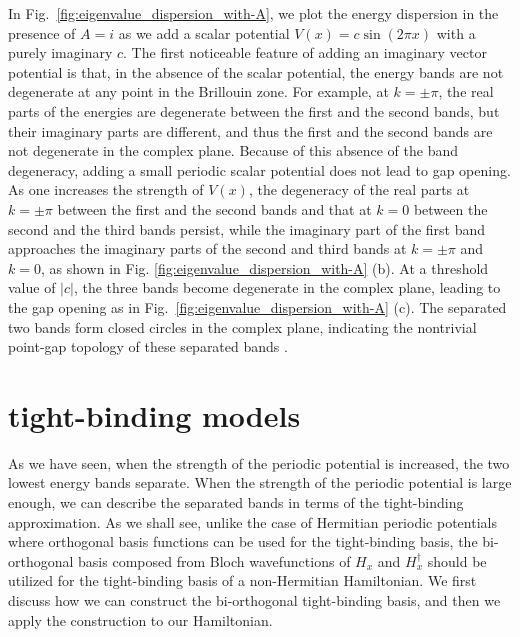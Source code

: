 \documentclass[prb,superscriptaddress,floatfix,twocolumn,showpacs]{revtex4-2}
\begin{document}
In Fig.~\ref{fig:eigenvalue_dispersion_with-A}, we plot the energy dispersion in the presence of $A = i$ as we add a scalar potential $V(x) = c \sin (2\pi x)$ with a purely imaginary $c$. 
The first noticeable feature of adding an imaginary vector potential is that, in the absence of the scalar potential, the energy bands are not degenerate at any point in the Brillouin zone. 
For example, at $k = \pm \pi$, the real parts of the energies are degenerate between the first and the second bands, but their imaginary parts are different, and thus the first and the second bands are not degenerate in the complex plane. 
Because of this absence of the band degeneracy, adding a small periodic scalar potential does not lead to gap opening. 
As one increases the strength of $V(x)$, the degeneracy of the real parts at $k = \pm \pi$ between the first and the second bands and that at $k = 0$ between the second and the third bands persist, while the imaginary part of the first band approaches the imaginary parts of the second and third bands at $k = \pm \pi$ and $k = 0$, as shown in Fig. \ref{fig:eigenvalue_dispersion_with-A} (b). 
At a threshold value of $|c|$, the three bands become degenerate in the complex plane, leading to the gap opening as in Fig.~\ref{fig:eigenvalue_dispersion_with-A} (c). 
The separated two bands form closed circles in the complex plane, indicating the nontrivial point-gap topology of these separated bands \cite{gong2018topological,kawabata2019symmetry}.

\section{tight-binding models}
\label{sec:tight-binding}
As we have seen, when the strength of the periodic potential is increased, the two lowest energy bands separate. 
When the strength of the periodic potential is large enough, we can describe the separated bands in terms of the tight-binding approximation. 
As we shall see, unlike the case of Hermitian periodic potentials where orthogonal basis functions can be used for the tight-binding basis, the bi-orthogonal basis composed from Bloch wavefunctions of $H_x$ and $H_x^\dagger$ should be utilized for the tight-binding basis of a non-Hermitian Hamiltonian. 
We first discuss how we can construct the bi-orthogonal tight-binding basis, and then we apply the construction to our Hamiltonian.
\end{document}
